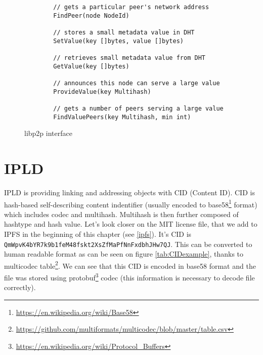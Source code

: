 \begin{figure}[h]
    \centering
    \begin{lstlisting}
        // gets a particular peer's network address
        FindPeer(node NodeId)

        // stores a small metadata value in DHT
        SetValue(key []bytes, value []bytes)

        // retrieves small metadata value from DHT
        GetValue(key []bytes)

        // announces this node can serve a large value
        ProvideValue(key Multihash)

        // gets a number of peers serving a large value
        FindValuePeers(key Multihash, min int)

    \end{lstlisting}
    \caption{libp2p interface}
    \label{libp2pInterface}
\end{figure}

\section{IPLD}
IPLD is providing linking and addressing objects with CID (Content ID). CID is hash-based self-describing content indentifier (usually encoded to base58\footnote{\url{https://en.wikipedia.org/wiki/Base58}} format) which includes codec and multihash. Multihash is then further composed of hashtype and hash value. Let's look closer on the MIT license file, that we add to IPFS in the beginning of this chapter (see \ref{ipfs}). It's CID is \texttt{QmWpvK4bYR7k9b1feM48fsk\-t2XsZfMaPfNnFxdbhJHw7QJ}. This can be converted to human readable format as can be seen on figure \ref{tab:CIDexample}, thanks to multicodec table\footnote{\url{https://github.com/multiformats/multicodec/blob/master/table.csv}}. We can see that this CID is encoded in base58 format and the file was stored using protobuf\footnote{\url{https://en.wikipedia.org/wiki/Protocol\_Buffers}} codec (this information is necessary to decode file correctly).



